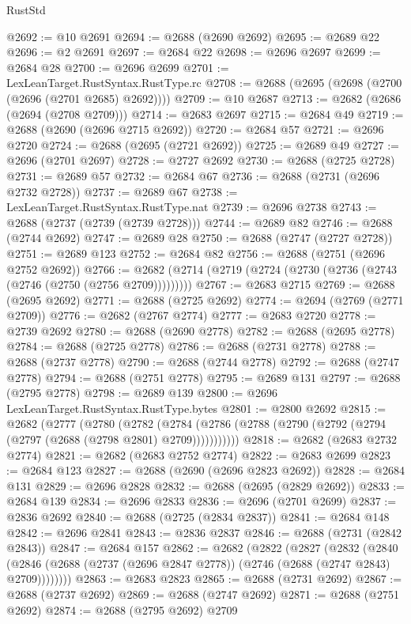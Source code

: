 \begin{lexlean}{RustStd}
\begin{coremodule}
@2692 := @10 @2691
@2694 := @2688 (@2690 @2692)
@2695 := @2689 @22
@2696 := @2 @2691
@2697 := @2684 @22
@2698 := @2696 @2697
@2699 := @2684 @28
@2700 := @2696 @2699
@2701 := LexLeanTarget.RustSyntax.RustType.rc
@2708 := @2688 (@2695 (@2698 (@2700 (@2696 (@2701 @2685) @2692))))
@2709 := @10 @2687
@2713 := @2682 (@2686 (@2694 (@2708 @2709)))
@2714 := @2683 @2697
@2715 := @2684 @49
@2719 := @2688 (@2690 (@2696 @2715 @2692))
@2720 := @2684 @57
@2721 := @2696 @2720
@2724 := @2688 (@2695 (@2721 @2692))
@2725 := @2689 @49
@2727 := @2696 (@2701 @2697)
@2728 := @2727 @2692
@2730 := @2688 (@2725 @2728)
@2731 := @2689 @57
@2732 := @2684 @67
@2736 := @2688 (@2731 (@2696 @2732 @2728))
@2737 := @2689 @67
@2738 := LexLeanTarget.RustSyntax.RustType.nat
@2739 := @2696 @2738
@2743 := @2688 (@2737 (@2739 (@2739 @2728)))
@2744 := @2689 @82
@2746 := @2688 (@2744 @2692)
@2747 := @2689 @28
@2750 := @2688 (@2747 (@2727 @2728))
@2751 := @2689 @123
@2752 := @2684 @82
@2756 := @2688 (@2751 (@2696 @2752 @2692))
@2766 := @2682 (@2714 (@2719 (@2724 (@2730 (@2736 (@2743 (@2746 (@2750 (@2756 @2709)))))))))
@2767 := @2683 @2715
@2769 := @2688 (@2695 @2692)
@2771 := @2688 (@2725 @2692)
@2774 := @2694 (@2769 (@2771 @2709))
@2776 := @2682 (@2767 @2774)
@2777 := @2683 @2720
@2778 := @2739 @2692
@2780 := @2688 (@2690 @2778)
@2782 := @2688 (@2695 @2778)
@2784 := @2688 (@2725 @2778)
@2786 := @2688 (@2731 @2778)
@2788 := @2688 (@2737 @2778)
@2790 := @2688 (@2744 @2778)
@2792 := @2688 (@2747 @2778)
@2794 := @2688 (@2751 @2778)
@2795 := @2689 @131
@2797 := @2688 (@2795 @2778)
@2798 := @2689 @139
@2800 := @2696 LexLeanTarget.RustSyntax.RustType.bytes
@2801 := @2800 @2692
@2815 := @2682
    (@2777
      (@2780
        (@2782
          (@2784 (@2786 (@2788 (@2790 (@2792 (@2794 (@2797 (@2688 (@2798 @2801) @2709)))))))))))
@2818 := @2682 (@2683 @2732 @2774)
@2821 := @2682 (@2683 @2752 @2774)
@2822 := @2683 @2699
@2823 := @2684 @123
@2827 := @2688 (@2690 (@2696 @2823 @2692))
@2828 := @2684 @131
@2829 := @2696 @2828
@2832 := @2688 (@2695 (@2829 @2692))
@2833 := @2684 @139
@2834 := @2696 @2833
@2836 := @2696 (@2701 @2699)
@2837 := @2836 @2692
@2840 := @2688 (@2725 (@2834 @2837))
@2841 := @2684 @148
@2842 := @2696 @2841
@2843 := @2836 @2837
@2846 := @2688 (@2731 (@2842 @2843))
@2847 := @2684 @157
@2862 := @2682
    (@2822
      (@2827
        (@2832
          (@2840 (@2846 (@2688 (@2737 (@2696 @2847 @2778)) (@2746 (@2688 (@2747 @2843) @2709))))))))
@2863 := @2683 @2823
@2865 := @2688 (@2731 @2692)
@2867 := @2688 (@2737 @2692)
@2869 := @2688 (@2747 @2692)
@2871 := @2688 (@2751 @2692)
@2874 := @2688 (@2795 @2692) @2709

\end{coremodule}
\end{lexlean}

